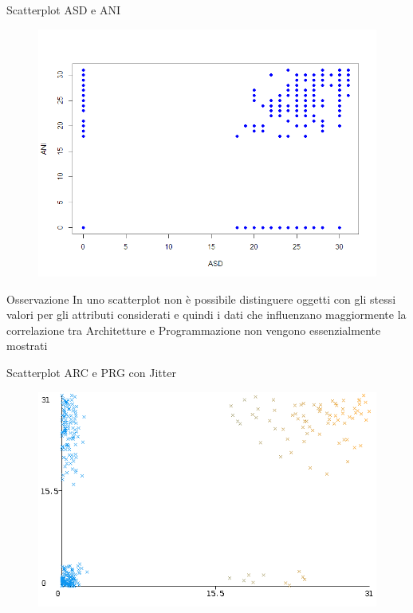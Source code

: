 \documentclass{beamer}
\begin{document}
  \begin{frame}{Scatterplot ASD e ANI}
    \begin{figure}[bt]
      \begin{center}
        \includegraphics[width=\textwidth]{../img/asdAni.png}
      \end{center}
    \end{figure}
  \end{frame}

  \begin{frame}{Osservazione}
    In uno scatterplot non è
possibile distinguere oggetti con gli stessi valori per gli attributi considerati
e quindi i dati che influenzano maggiormente la correlazione tra Architetture
e Programmazione non vengono essenzialmente mostrati
  \end{frame}
  

  \begin{frame}{Scatterplot ARC e PRG con Jitter}
    \begin{figure}[bt]
      \begin{center}
        \includegraphics[width=\textwidth]{../img/arcPrgWeka.png}
      \end{center}
    \end{figure}
  \end{frame}
\end{document}

